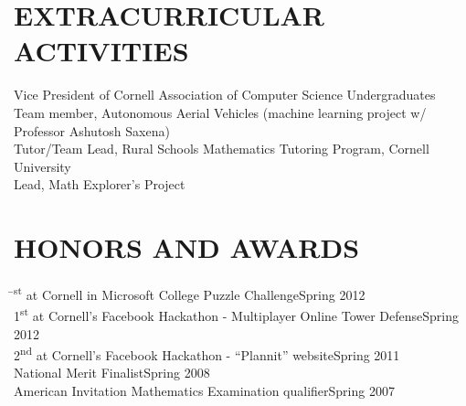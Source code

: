 \documentclass{res}
\begin{document}
\begin{resume}
\section{EXTRACURRICULAR ACTIVITIES}
    Vice President of Cornell Association of Computer Science Undergraduates \\
    Team member, Autonomous Aerial Vehicles (machine learning project w/ Professor Ashutosh Saxena) \\
    Tutor/Team Lead, Rural Schools Mathematics Tutoring Program, Cornell University \\
    Lead, Math Explorer's Project

\section{HONORS AND AWARDS}
    \vspace{-0.1in}
    \begin{tabbing}
    \hspace{5.25in}\=\textsuperscript{st} at Cornell in Microsoft College Puzzle Challenge\>Spring 2012 \\
    1\textsuperscript{st} at Cornell's Facebook Hackathon - Multiplayer Online Tower Defense\>Spring 2012 \\
    2\textsuperscript{nd} at Cornell's Facebook Hackathon - ``Plannit'' website\>Spring 2011 \\
    National Merit Finalist\>Spring 2008 \\
    American Invitation Mathematics Examination qualifier\>Spring 2007
    \end{tabbing}
 
\end{resume}
\end{document}

